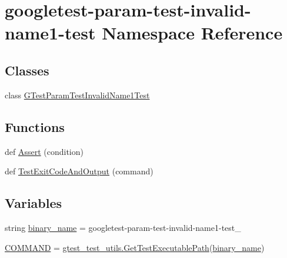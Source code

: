 \hypertarget{namespacegoogletest-param-test-invalid-name1-test}{}\section{googletest-\/param-\/test-\/invalid-\/name1-\/test Namespace Reference}
\label{namespacegoogletest-param-test-invalid-name1-test}
\subsection*{Classes}
\begin{DoxyCompactItemize}
\item 
class \mbox{\hyperlink{classgoogletest-param-test-invalid-name1-test_1_1GTestParamTestInvalidName1Test}{G\+Test\+Param\+Test\+Invalid\+Name1\+Test}}
\end{DoxyCompactItemize}
\subsection*{Functions}
\begin{DoxyCompactItemize}
\item 
def \mbox{\hyperlink{namespacegoogletest-param-test-invalid-name1-test_a2322bcd13b9e4fc90292b041a99fe368}{Assert}} (condition)
\item 
def \mbox{\hyperlink{namespacegoogletest-param-test-invalid-name1-test_aabb7407b7c6d63bd6b06899c5f5bc02e}{Test\+Exit\+Code\+And\+Output}} (command)
\end{DoxyCompactItemize}
\subsection*{Variables}
\begin{DoxyCompactItemize}
\item 
string \mbox{\hyperlink{namespacegoogletest-param-test-invalid-name1-test_a073018906c94da733e54cf4c457bec29}{binary\+\_\+name}} = \textquotesingle{}googletest-\/param-\/test-\/invalid-\/name1-\/test\+\_\+\textquotesingle{}
\item 
\mbox{\hyperlink{namespacegoogletest-param-test-invalid-name1-test_a92131bc06f98ffc4aa4a6effd87da6fd}{C\+O\+M\+M\+A\+ND}} = \mbox{\hyperlink{namespacegtest__test__utils_a89ed3717984a80ffbb7a9c92f71b86a2}{gtest\+\_\+test\+\_\+utils.\+Get\+Test\+Executable\+Path}}(\mbox{\hyperlink{namespacegoogletest-param-test-invalid-name1-test_a073018906c94da733e54cf4c457bec29}{binary\+\_\+name}})
\end{DoxyCompactItemize}


